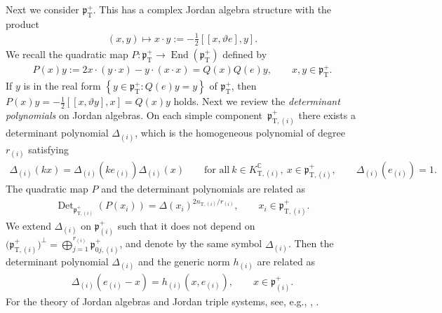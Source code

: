 \documentclass[11pt]{article}
\numberwithin{equation}{section}
\newcommand{\BC}{\mathbb{C}}
\newcommand{\fp}{\mathfrak{p}}
\newcommand{\rT}{\mathrm{T}}
\newcommand{\End}{\operatorname{End}}
\newcommand{\Det}{\operatorname{Det}}
\begin{document}
Next we consider $\fp^+_\rT$. This has a complex Jordan algebra structure with the product
\begin{gather*} (x,y)\mapsto x\cdot y:=-\tfrac{1}{2}[[x,\vartheta e],y]. \end{gather*}
We recall the quadratic map $P\colon \fp^+_\rT\to\End(\fp^+_\rT)$ defined by
\begin{gather}\label{quad_repn}
P(x)y:=2x\cdot(y\cdot x)-y\cdot(x\cdot x)=Q(x)Q(e)y, \qquad x,y\in\fp^+_\rT .
\end{gather}
If $y$ is in the real form $\left\{y\in\fp^+_\rT\colon Q(e)y=y\right\}$ of $\fp^+_\rT$,
then $P(x)y=-\frac{1}{2}[[x,\vartheta y],x]=Q(x)y$ holds.
Next we review the \textit{determinant polynomials} on Jordan algebras.
On each simple component~$\fp^+_{\rT,(i)}$ there exists a determinant polynomial $\Delta_{(i)}$,
which is the homogeneous polynomial of degree~$r_{(i)}$ satisfying
\begin{gather*}
\Delta_{(i)}(kx)=\Delta_{(i)}(ke_{(i)})\Delta_{(i)}(x)
\qquad \text{for all} \ k\in K^\BC_{\rT,(i)},\ x\in \fp^+_{\rT,(i)},\qquad
\Delta_{(i)}(e_{(i)})=1.
\end{gather*}
The quadratic map $P$ and the determinant polynomials are related as
\begin{gather*} \Det_{\fp^+_{\rT,(i)}}(P(x_i))=\Delta(x_i)^{2n_{\rT,(i)}/r_{(i)}}, \qquad x_i\in\fp^+_{\rT,(i)} . \end{gather*}
We  extend $\Delta_{(i)}$ on $\fp^+_{(i)}$ such that it does not depend on $\big(\fp^+_{\rT,(i)}\big)^\bot=\bigoplus\limits_{j=1}^{r_{(i)}} \fp^+_{0j,(i)}$, and denote by the same symbol $\Delta_{(i)}$.
Then the determinant polynomial $\Delta_{(i)}$ and the generic norm $h_{(i)}$ are related as
\begin{gather}\label{det_norm}
\Delta_{(i)}(e_{(i)}-x)=h_{(i)}(x,e_{(i)}), \qquad x\in\fp^+_{(i)}.
\end{gather}
For the theory of Jordan algebras and Jordan triple systems, see, e.g., \cite[Part V]{FKKLR}, \cite{FK, L,Sat}.
\end{document}
